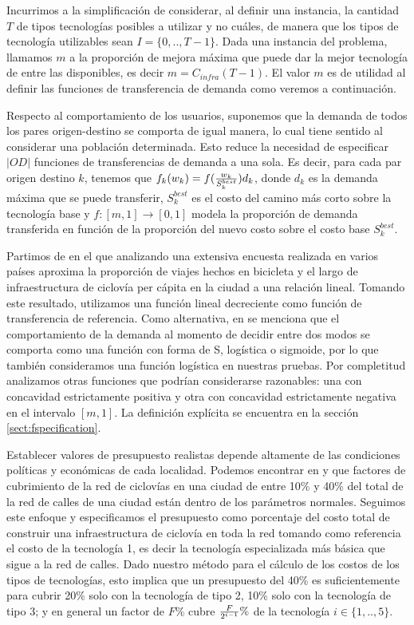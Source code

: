 Incurrimos a la simplificación de considerar, al definir una instancia, la cantidad $T$ de tipos tecnologías posibles a utilizar y no cuáles, de manera que los tipos de tecnología utilizables sean $I = \{0,.., T - 1\}$. Dada una instancia del problema, llamamos $m$ a la proporción de mejora máxima que puede dar la mejor tecnología de entre las disponibles, es decir $m = C_{infra}(T - 1)$. El valor $m$ es de utilidad al definir las funciones de transferencia de demanda como veremos a continuación.

Respecto al comportamiento de los usuarios, suponemos que la demanda de todos los pares origen-destino se comporta de igual manera, lo cual tiene sentido al considerar una población determinada. Esto reduce la necesidad de especificar $|OD|$ funciones de transferencias de demanda a una sola. Es decir, para cada par origen destino $k$, tenemos que $f_k(w_k) = f({w_k \over S^{best}_k})d_k$, donde $d_k$ es la demanda máxima que se puede transferir, $S^{best}_k$ es el costo del camino más corto sobre la tecnología base y $f: [m, 1] \rightarrow [0, 1]$ modela la proporción de demanda transferida en función de la proporción del nuevo costo sobre el costo base $S^{best}_k$.

Partimos de \cite{shwe2014} en el que analizando una extensiva encuesta realizada en varios países aproxima la proporción de viajes hechos en bicicleta y el largo de infraestructura de ciclovía per cápita en la ciudad a una relación lineal. Tomando este resultado, utilizamos una función lineal decreciente como función de transferencia de referencia. Como alternativa, en \cite{ortuz2011} se menciona que el comportamiento de la demanda al momento de decidir entre dos modos se comporta como una función con forma de S, logística o sigmoide, por lo que también consideramos una función logística en nuestras pruebas. Por completitud analizamos otras funciones que podrían considerarse razonables: una con concavidad estrictamente positiva y otra con concavidad estrictamente negativa en el intervalo $[m, 1]$. La definición explícita se encuentra en la sección \ref{sect:fspecification}.

Establecer valores de presupuesto realistas depende altamente de las condiciones políticas y económicas de cada localidad. Podemos encontrar en \cite{rios2015} y \cite{shwe2014} que factores de cubrimiento de la red de ciclovías en una ciudad de entre 10\% y 40\% del total de la red de calles de una ciudad están dentro de los parámetros normales. Seguimos este enfoque y especificamos el presupuesto como porcentaje del costo total de construir una infraestructura de ciclovía en toda la red tomando como referencia el costo de la tecnología 1, es decir la tecnología especializada más básica que sigue a la red de calles. Dado nuestro método para el cálculo de los costos de los tipos de tecnologías, esto implica que un presupuesto del 40\% es suficientemente para cubrir 20\% solo con la tecnología de tipo 2, 10\% solo con la tecnología de tipo 3; y en general un factor de $F\%$ cubre ${F \over {2^{i - 1}}}\%$ de la tecnología $i \in \{1,..,5\}$.

